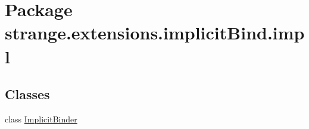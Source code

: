 \hypertarget{namespacestrange_1_1extensions_1_1implicit_bind_1_1impl}{\section{Package strange.\-extensions.\-implicit\-Bind.\-impl}
\label{namespacestrange_1_1extensions_1_1implicit_bind_1_1impl}
}
\subsection*{Classes}
\begin{DoxyCompactItemize}
\item 
class \hyperlink{classstrange_1_1extensions_1_1implicit_bind_1_1impl_1_1_implicit_binder}{Implicit\-Binder}
\end{DoxyCompactItemize}
